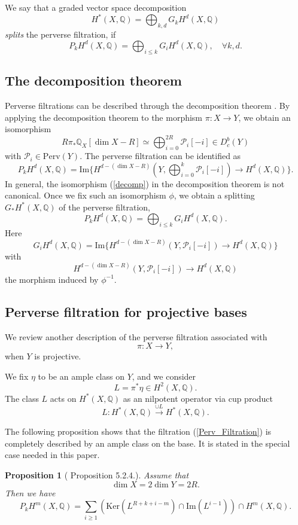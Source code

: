 \documentclass[11pt]{amsart}
\theoremstyle{plain}
\newtheorem{prop}[thm]{Proposition}
\theoremstyle{definition}
\theoremstyle{remark}
\newcommand{\BQ}{{\mathbb{Q}}}
\begin{document}
We say that a  graded vector space decomposition
\[
H^*(X, \BQ) = \bigoplus_{k,d} G_k H^d(X, \BQ)
\]
\emph{splits} the perverse filtration, if 
\[
P_k H^d(X, \BQ) = \bigoplus_{i \leq k} G_i H^d(X, \BQ), \quad \forall k,d.
\]


\subsection{The decomposition theorem}\label{sec1.3}
Perverse filtrations can be described through the decomposition theorem \cite{BBD, dCM0}. By applying the decomposition theorem to the morphism $\pi: X \to Y$, we obtain an isomorphism
\begin{equation}\label{decomp}
R\pi_*\BQ_X[\dim X- { R}]\simeq \bigoplus_{i=0}^{2{ R}}\mathcal{P}_i[-i] \in D^b_c(Y)
\end{equation}
with $\mathcal{P}_i  \in \mathrm{Perv}(Y)$. The perverse filtration can be identified as
\[
P_kH^d(X,\BQ)=\mathrm{Im}\Big\{H^{d-(\dim X - { R})}(Y, \bigoplus_{i=0}^k\mathcal{P}_i[-i])\to H^d(X,\BQ)\Big\}.
\]
In general, the isomorphism (\ref{decomp}) in the decomposition theorem is not canonical. Once we fix such an isomorphism $\phi$, we obtain a splitting $G_\ast H^\ast(X, \BQ)$ of the perverse filtration,
\[
P_kH^d(X, \BQ) = \bigoplus_{i\leq k} G_iH^d(X, \BQ).
\]
Here
\[
G_iH^d(X, \BQ) = \mathrm{Im}\Big\{ H^{d-(\dim X - { R})}(Y, \mathcal{P}_i[-i])\to H^d(X,\BQ)\Big\}
\]
with
\[
H^{d-(\dim X - {R})}(Y, \mathcal{P}_i[-i])\to H^d(X,\BQ)
\]
the morphism induced by $\phi^{-1}$.

\subsection{Perverse filtration for projective bases}
We review another description of the perverse filtration associated with
\[
\pi: X \to Y,
\]
when $Y$ is projective.

We fix $\eta$ to be an ample class on $Y$, and we consider
\[
L = \pi^* \eta \in H^2(X, \BQ).
\]
The class $L$ acts on $H^*(X, \BQ)$ as an nilpotent operator via cup product
\[
L: H^*(X, \BQ) \xrightarrow{\cup L} H^*(X, \BQ).
\]

The following proposition shows that the filtration (\ref{Perv_Filtration}) is completely described by an ample class on the base.  It is stated in the special case needed in this paper.


\begin{prop}[\cite{dCM0} Proposition 5.2.4.] \label{prop1.1}
Assume that
\begin{equation*}
\dim X = 2 \dim Y = 2R.
\end{equation*}
Then we have
\[
P_kH^m(X, \BQ) = \sum_{i\geq 1} \left(
\mathrm{Ker}(L^{R+k+i-m}) \cap \mathrm{Im}(L^{i-1}) \right) \cap H^m(X, \BQ).
\]
\end{prop}
\end{document}
